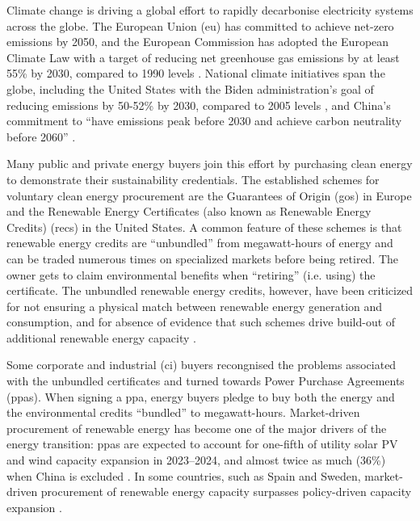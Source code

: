 

Climate change is driving a global effort to rapidly decarbonise electricity systems across the globe. 
The European Union (\gls{eu}) has committed to achieve net-zero emissions by 2050, and the European Commission has adopted the European Climate Law with a target of reducing net greenhouse gas emissions by at least 55\% by 2030, compared to 1990 levels \cite{EuropeanClimateLaw2020}. 
National climate initiatives span the globe, including the United States with the Biden administration's goal of reducing emissions by 50-52\% by 2030, compared to 2005 levels \cite{BidenClimatePlan2021}, and China's commitment to \enquote{have \co emissions peak before 2030 and achieve carbon neutrality before 2060} \cite{ChinaNetZero-IEA}.


Many public and private energy buyers join this effort by purchasing clean energy to demonstrate their sustainability credentials. The established schemes for voluntary clean energy procurement are the Guarantees of Origin (\gls{go}s) in Europe and the Renewable Energy Certificates (also known as Renewable Energy Credits) (\gls{rec}s) in the United States.
A common feature of these schemes is that renewable energy credits are \enquote{unbundled} from megawatt-hours of energy and can be traded numerous times on specialized markets before being retired.
The owner gets to claim environmental benefits when \enquote{retiring} (i.e. using) the certificate.
The unbundled renewable energy credits, however, have been criticized for not ensuring a physical match between renewable energy generation and consumption, and for absence of evidence that such schemes drive build-out of additional renewable energy capacity \cite{bjorn-RECSnatcom-2022, gillenwater-2014, re100report-2020, spglobal-recs, bock-icelandGOproblem}.

Some corporate and industrial (\gls{ci}) buyers recongnised the problems associated with the unbundled certificates and turned towards Power Purchase Agreements (\gls{ppa}s). 
When signing a \gls{ppa}, energy buyers pledge to buy both the energy and the environmental credits \enquote{bundled} to megawatt-hours.
Market-driven procurement of renewable energy has become one of the major drivers of the energy transition: \gls{ppa}s are expected to account for one-fifth of utility solar PV and wind capacity expansion in 2023--2024, and almost twice as much (36\%) when China is excluded \cite{iea-REppa2023}.
In some countries, such as Spain and Sweden, market-driven procurement of renewable energy capacity surpasses policy-driven capacity expansion \cite{iea-REppa2023}.

